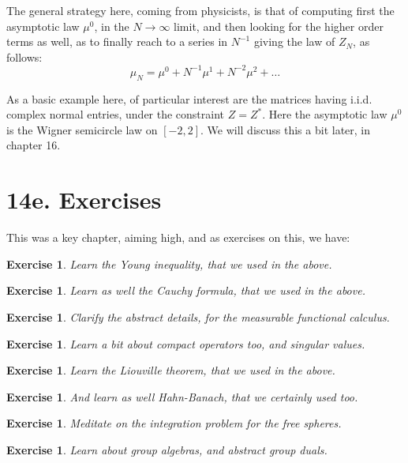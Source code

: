\documentclass[12pt]{amsbook}
\newtheorem{exercise}[theorem]{Exercise}
\begin{document}
The general strategy here, coming from physicists, is that of computing first the asymptotic law $\mu^0$, in the $N\to\infty$ limit, and then looking for the higher order terms as well, as to finally reach to a series in $N^{-1}$ giving the law of $Z_N$, as follows: 
$$\mu_N=\mu^0+N^{-1}\mu^1+N^{-2}\mu^2+\ldots$$

As a basic example here, of particular interest are the matrices having i.i.d. complex normal entries, under the constraint $Z=Z^*$. Here the asymptotic law $\mu^0$ is the Wigner semicircle law on $[-2,2]$. We will discuss this a bit later, in chapter 16.

\section*{14e. Exercises} 

This was a key chapter, aiming high, and as exercises on this, we have:

\begin{exercise}
Learn the Young inequality, that we used in the above.
\end{exercise}

\begin{exercise}
Learn as well the Cauchy formula, that we used in the above.
\end{exercise}

\begin{exercise}
Clarify the abstract details, for the measurable functional calculus.
\end{exercise}

\begin{exercise}
Learn a bit about compact operators too, and singular values.
\end{exercise}

\begin{exercise}
Learn the Liouville theorem, that we used in the above.
\end{exercise}

\begin{exercise}
And learn as well Hahn-Banach, that we certainly used too.
\end{exercise}

\begin{exercise}
Meditate on the integration problem for the free spheres.
\end{exercise}

\begin{exercise}
Learn about group algebras, and abstract group duals.
\end{exercise}
\end{document}
